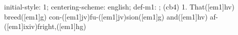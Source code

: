 initial-style: 1;
centering-scheme: english;
def-m1: \grealign;
(cb4) 1. That([em1]hv) breed([em1]g) con-([em1]jv)fu-([em1]jv)sion([em1]g) and([em1]hv) af-([em1]ixiv)fright,([em1]hg)